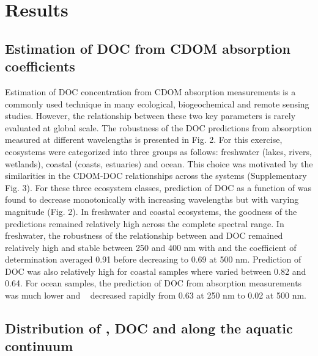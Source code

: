 
\section*{Results}
\label{sec:Results}

\subsection*{Estimation of DOC from CDOM absorption coefficients}

Estimation of DOC concentration from CDOM absorption measurements is a commonly used technique in many ecological, biogeochemical and remote sensing studies. However, the relationship between these two key parameters is rarely evaluated at global scale. The robustness of the DOC predictions from absorption measured at different wavelengths is presented in Fig. 2. For this exercise, ecosystems were categorized into three groups as follows: freshwater (lakes, rivers, wetlands), coastal (coasts, estuaries) and ocean. This choice was motivated by the similarities in the CDOM-DOC relationships across the systems (Supplementary Fig. 3). For these three ecosystem classes, prediction of DOC as a function of \acdom{\lambda} was found to decrease monotonically with increasing wavelengths but with varying magnitude (Fig. 2). In freshwater and coastal ecosystems, the goodness of the predictions remained relatively high across the complete spectral range. In freshwater, the robustness of the relationship between \acdom{\lambda} and DOC remained relatively high and stable between 250 and 400 nm with and the coefficient of determination averaged 0.91 before decreasing to 0.69 at 500 nm. Prediction of DOC was also relatively high for coastal samples where \rr varied between 0.82 and 0.64. For ocean samples, the prediction of DOC from absorption measurements was much lower and \rr~ decreased rapidly from 0.63 at 250 nm to 0.02 at 500 nm.

\subsection*{Distribution of , DOC and  along the aquatic continuum}

